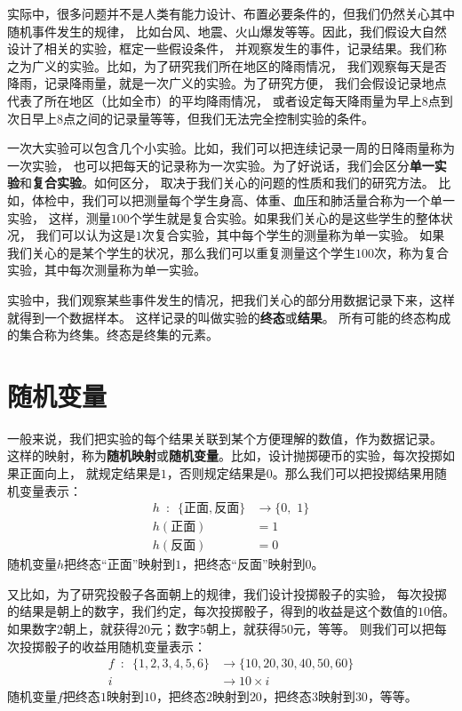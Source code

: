 \documentclass[12pt,UTF8]{ctexbook}
\theoremstyle{definition}
\theoremstyle{plain}
\begin{document}
实际中，很多问题并不是人类有能力设计、布置必要条件的，但我们仍然关心其中随机事件发生的规律，
比如台风、地震、火山爆发等等。因此，我们假设大自然设计了相关的实验，框定一些假设条件，
并观察发生的事件，记录结果。我们称之为广义的实验。比如，为了研究我们所在地区的降雨情况，
我们观察每天是否降雨，记录降雨量，就是一次广义的实验。为了研究方便，
我们会假设记录地点代表了所在地区（比如全市）的平均降雨情况，
或者设定每天降雨量为早上$8$点到次日早上$8$点之间的记录量等等，但我们无法完全控制实验的条件。

一次大实验可以包含几个小实验。比如，我们可以把连续记录一周的日降雨量称为一次实验，
也可以把每天的记录称为一次实验。为了好说话，我们会区分\textbf{单一实验}和\textbf{复合实验}。如何区分，
取决于我们关心的问题的性质和我们的研究方法。
比如，体检中，我们可以把测量每个学生身高、体重、血压和肺活量合称为一个单一实验，
这样，测量$100$个学生就是复合实验。如果我们关心的是这些学生的整体状况，
我们可以认为这是$1$次复合实验，其中每个学生的测量称为单一实验。
如果我们关心的是某个学生的状况，那么我们可以重复测量这个学生$100$次，称为复合实验，其中每次测量称为单一实验。

实验中，我们观察某些事件发生的情况，把我们关心的部分用数据记录下来，这样就得到一个数据样本。
这样记录的叫做实验的\textbf{终态}或\textbf{结果}。
所有可能的终态构成的集合称为终集。终态是终集的元素。

\section{随机变量}

一般来说，我们把实验的每个结果关联到某个方便理解的数值，作为数据记录。
这样的映射，称为\textbf{随机映射}或\textbf{随机变量}。比如，设计抛掷硬币的实验，每次投掷如果正面向上，
就规定结果是$1$，否则规定结果是$0$。那么我们可以把投掷结果用随机变量表示：
\begin{align*}
    h \,\,\, : \,\,\, \{\mbox{正面}, \mbox{反面}\} &\rightarrow \{0,\,\, 1\}  \\
    h(\mbox{正面}) &= 1  \\
    h(\mbox{反面}) &= 0  
\end{align*}
随机变量$h$把终态“正面”映射到$1$，把终态“反面”映射到$0$。

又比如，为了研究投骰子各面朝上的规律，我们设计投掷骰子的实验，
每次投掷的结果是朝上的数字，我们约定，每次投掷骰子，得到的收益是这个数值的$10$倍。
如果数字$2$朝上，就获得$20$元；数字$5$朝上，就获得$50$元，等等。
则我们可以把每次投掷骰子的收益用随机变量表示：
\begin{align*}
f \,\,\, : \,\,\, \{1,2,3,4,5,6\} &\rightarrow \{10,20,30,40,50,60\}  \\
 i &\rightarrow 10\times i  
\end{align*}
随机变量$f$把终态$1$映射到$10$，把终态$2$映射到$20$，把终态$3$映射到$30$，等等。
\end{document}
